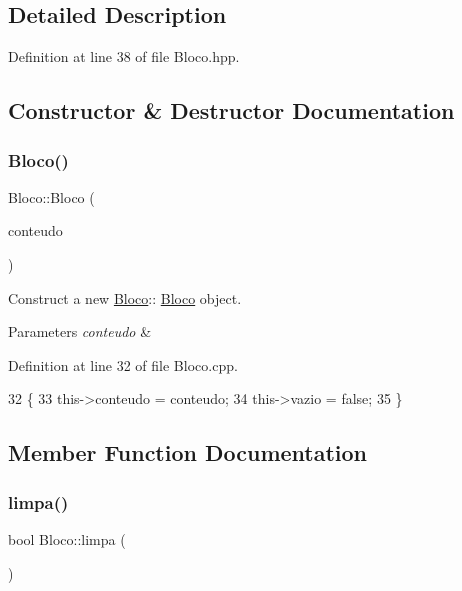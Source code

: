 \subsection{Detailed Description}


Definition at line 38 of file Bloco.\+hpp.



\subsection{Constructor \& Destructor Documentation}
\mbox{\label{class_bloco_a1e474398aae75176e9d6bb14b8258541}} 
\subsubsection{\texorpdfstring{Bloco()}{Bloco()}}
{\footnotesize\ttfamily Bloco\+::\+Bloco (\begin{DoxyParamCaption}\item[{\mbox{\hyperlink{class_colocavel_em_bloco}{Colocavel\+Em\+Bloco}} $\ast$}]{conteudo }\end{DoxyParamCaption})}



Construct a new \mbox{\hyperlink{class_bloco}{Bloco}}\+:\+: \mbox{\hyperlink{class_bloco}{Bloco}} object. 


\begin{DoxyParams}{Parameters}
{\em conteudo} & \\
\hline
\end{DoxyParams}


Definition at line 32 of file Bloco.\+cpp.


\begin{DoxyCode}
32                                        \{
33     this->conteudo = conteudo;
34     this->vazio = \textcolor{keyword}{false};
35 \}
\end{DoxyCode}


\subsection{Member Function Documentation}
\mbox{\label{class_bloco_a8260c149942e04f10f069696a6363451}} 
\subsubsection{\texorpdfstring{limpa()}{limpa()}}
{\footnotesize\ttfamily bool Bloco\+::limpa (\begin{DoxyParamCaption}{ }\end{DoxyParamCaption})}

